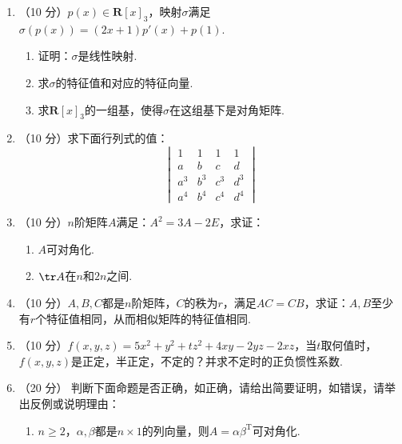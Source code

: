 \begin{enumerate}
\begin{enumerate}
        \item 证明：\(B_2\)是\(\mathbf{R}^3\)的一组基.

        \item 求\(\sigma\)在基\(B_2\)下的矩阵表示.
    \end{enumerate}

    \item （10 分）\(p(x)\in\mathbf{R}[x]_3\)，映射\(\sigma\)满足\(\sigma(p(x))=(2x+1)p'(x)+p(1)\).
    \begin{enumerate}
        \item 证明：\(\sigma\)是线性映射.

        \item 求\(\sigma\)的特征值和对应的特征向量.

        \item 求\(\mathbf{R}[x]_3\)的一组基，使得\(\sigma\)在这组基下是对角矩阵.
    \end{enumerate}

    \item （10 分）求下面行列式的值：
    \[ \begin{vmatrix}
        1 & 1 & 1 & 1 \\
        a & b & c & d \\
        a^3 & b^3 & c^3 & d^3 \\
        a^4 & b^4 & c^4 & d^4
    \end{vmatrix} \]

    \item （10 分）\(n\)阶矩阵\(A\)满足：\(A^2=3A-2E\)，求证：
    \begin{enumerate}
        \item \(A\)可对角化.

        \item \(\tr A\)在\(n\)和\(2n\)之间.
    \end{enumerate}

    \item （10 分）\(A,B,C\)都是\(n\)阶矩阵，\(C\)的秩为\(r\)，满足\(AC=CB\)，求证：\(A,B\)至少有\(r\)个特征值相同，从而相似矩阵的特征值相同.

    \item （10 分）\(f(x,y,z)=5x^2+y^2+tz^2+4xy-2yz-2xz\)，当\(t\)取何值时，\(f(x,y,z)\)是正定，半正定，不定的？并求不定时的正负惯性系数.

    \item （20 分）
    判断下面命题是否正确，如正确，请给出简要证明，如错误，请举出反例或说明理由：
    \begin{enumerate}
        \item \(n\geqslant 2\)，\(\alpha,\beta\)都是\(n\times1\)的列向量，则\(A=\alpha\beta^\mathrm{T}\)可对角化.


\end{enumerate}
\end{enumerate}
